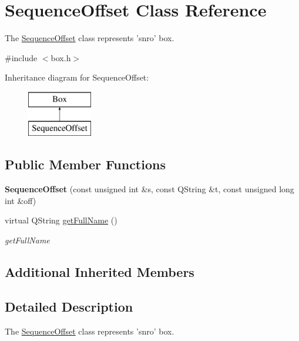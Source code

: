 \hypertarget{class_sequence_offset}{\section{Sequence\-Offset Class Reference}
\label{class_sequence_offset}
}


The \hyperlink{class_sequence_offset}{Sequence\-Offset} class represents 'snro' box.  




{\ttfamily \#include $<$box.\-h$>$}

Inheritance diagram for Sequence\-Offset\-:\begin{figure}[H]
\begin{center}
\leavevmode
\includegraphics[height=2.000000cm]{class_sequence_offset}
\end{center}
\end{figure}
\subsection*{Public Member Functions}
\begin{DoxyCompactItemize}
\item 
\hypertarget{class_sequence_offset_a47e1fc5b2dc6dbebc0c4bfd16608576f}{{\bfseries Sequence\-Offset} (const unsigned int \&s, const Q\-String \&t, const unsigned long int \&off)}\label{class_sequence_offset_a47e1fc5b2dc6dbebc0c4bfd16608576f}

\item 
virtual Q\-String \hyperlink{class_sequence_offset_af94648de33aecf8edf6eb0d73565c991}{get\-Full\-Name} ()
\begin{DoxyCompactList}\small\item\em get\-Full\-Name \end{DoxyCompactList}\end{DoxyCompactItemize}
\subsection*{Additional Inherited Members}


\subsection{Detailed Description}
The \hyperlink{class_sequence_offset}{Sequence\-Offset} class represents 'snro' box. 


